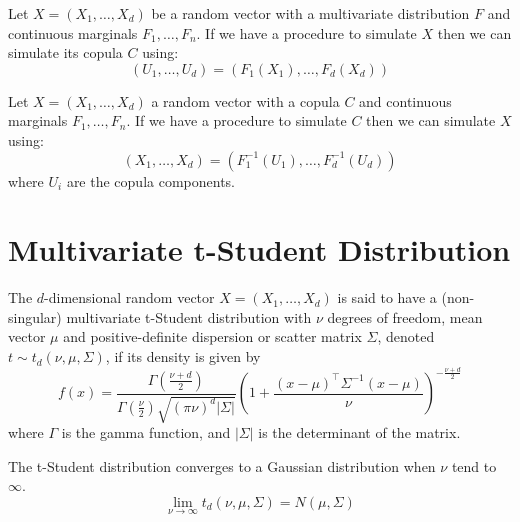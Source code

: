 \documentclass[11pt,fleqn]{book} %
\begin{document}
\begin{corollary}
	\label{cor:cop2}
	Let $X=(X_1, \dots, X_d)$ be a random vector with a multivariate 
	distribution $F$ and continuous marginals $F_1, \dots, F_n$.
	If we have a procedure to simulate $X$ then we can simulate 
	its copula $C$ using:
	\begin{displaymath}
		(U_1, \dots, U_d) = (F_1(X_1), \dots, F_d(X_d))
	\end{displaymath}
\end{corollary}

\begin{corollary}
	\label{cor:cop3}
	Let $X=(X_1, \dots, X_d)$ a random vector with a copula $C$
	and continuous marginals $F_1, \dots, F_n$. If we have a
	procedure to simulate $C$ then we can simulate $X$ using:
	\begin{displaymath}
		(X_1, \dots, X_d) = (F_1^{-1}(U_1), \dots, F_d^{-1}(U_d))
	\end{displaymath}
	where $U_i$ are the copula components.
\end{corollary}

\section{Multivariate t-Student Distribution}
\label{ap:mtsd}

\begin{definition}
	The $d$-dimensional random vector $X=(X_1,\dots,X_d)$ is said to have a 
	(non-singular) multivariate t-Student distribution with $\nu$ degrees of freedom, 
	mean vector $\mu$ and positive-definite dispersion or scatter matrix $\Sigma$, 
	denoted $t \sim t_d(\nu,\mu,\Sigma)$, if its density is given by
	\begin{displaymath}
		f(x)=\frac{\Gamma\left(\frac{\nu+d}{2}\right)}{\Gamma\left(\frac{\nu}{2}\right)\sqrt{(\pi \nu)^d |\Sigma|}}
		\left(
		1+ \frac{(x-\mu)^\top\Sigma^{-1}(x-\mu)}{\nu}
		\right)^{-\frac{\nu+d}{2}}
	\end{displaymath}
	\noindent where $\Gamma$ is the gamma function, and $|\Sigma|$ is the 
	determinant of the matrix.
\end{definition}

\begin{proposition}
	The t-Student distribution converges to a Gaussian distribution 
	when $\nu$ tend to $\infty$.
	\begin{displaymath}
		\lim_{\nu \to \infty} t_d(\nu,\mu,\Sigma) = N(\mu,\Sigma)
	\end{displaymath}
\end{proposition}
\end{document}
